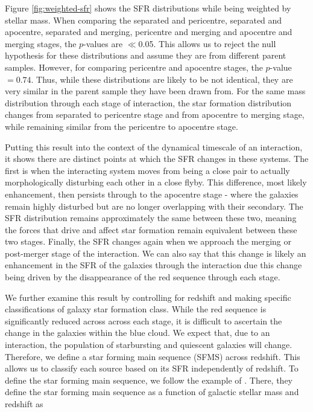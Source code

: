 Figure \ref{fig:weighted-sfr} shows the SFR distributions while being weighted by stellar mass. When comparing the separated and pericentre, separated and apocentre, separated and merging, pericentre and merging and apocentre and merging stages, the $p$-values are $\ll$0.05. This allows us to reject the null hypothesis for these distributions and assume they are from different parent samples. However, for comparing pericentre and apocentre stages, the $p$-value$=0.74$. Thus, while these distributions are likely to be not identical, they are very similar in the parent sample they have been drawn from. For the same mass distribution through each stage of interaction, the star formation distribution changes from separated to pericentre stage and from apocentre to merging stage, while remaining similar from the pericentre to apocentre stage.

Putting this result into the context of the dynamical timescale of an interaction, it shows there are distinct points at which the SFR changes in these systems. The first is when the interacting system moves from being a close pair to actually morphologically disturbing each other in a close flyby. This difference, most likely enhancement, then persists through to the apocentre stage - where the galaxies remain highly disturbed but are no longer overlapping with their secondary. The SFR distribution remains approximately the same between these two, meaning the forces that drive and affect star formation remain equivalent between these two stages. Finally, the SFR changes again when we approach the merging or post-merger stage of the interaction. We can also say that this change is likely an enhancement in the SFR of the galaxies through the interaction due this change being driven by the disappearance of the red sequence through each stage.

We further examine this result by controlling for redshift and making specific classifications of galaxy star formation class. While the red sequence is significantly reduced across across each stage, it is difficult to ascertain the change in the galaxies within the blue cloud. We expect that, due to an interaction, the population of starbursting and quiescent galaxies will change. Therefore, we define a star forming main sequence (SFMS) across redshift. This allows us to classify each source based on its SFR independently of redshift. To define the star forming main sequence, we follow the example of \citet{2019MNRAS.484.4360A}. There, they define the star forming main sequence as a function of galactic stellar mass and redshift as

